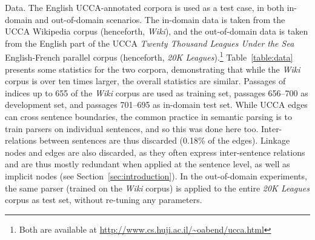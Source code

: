 \documentclass[12pt]{article}
\makeatletter
\newcommand{\secref}[1]{Section~\ref{#1}}
\newcommand{\tabref}[1]{Table~\ref{#1}}
\renewcommand{\paragraph}{
  \@startsection{paragraph}{4}
  {\z@}{.3ex \@plus .3ex \@minus .2ex}{-1em}
  {\normalfont\normalsize\bfseries}
}
\makeatother
\begin{document}
\paragraph{Data.}\label{sec:data}
The English UCCA-annotated corpora \cite{abend2013universal} is used
as a test case, in both in-domain and out-of-domain scenarios.
The in-domain data is taken from the UCCA Wikipedia corpus (henceforth, \textit{Wiki}),
and the out-of-domain data is taken from the English part of the UCCA
\textit{Twenty Thousand Leagues Under the Sea} English-French parallel corpus
(henceforth, \textit{20K Leagues}).\footnote{Both are available at
\url{http://www.cs.huji.ac.il/~oabend/ucca.html}}
\tabref{table:data} presents some statistics for the two corpora, demonstrating that while
the \textit{Wiki} corpus is over ten times larger, the overall statistics are
similar.
Passages of indices up to 655 of the \textit{Wiki} corpus are used as training
set, passages 656--700 as development set, and passages 701--695 as in-domain test set.
While UCCA edges can cross sentence boundaries, the common
practice in semantic parsing is to train parsers on individual sentences,
and so this was done here too.
Inter-relations between sentences are thus discarded (0.18\% of the edges).
Linkage nodes and edges are also discarded, as they often express
inter-sentence relations and are thus mostly redundant when applied at the
sentence level, as well as implicit nodes (see \secref{sec:introduction}).
In the out-of-domain experiments, the same parser
(trained on the \textit{Wiki} corpus) is applied to the entire \textit{20K
Leagues} corpus as test set, without re-tuning any parameters.
\end{document}
